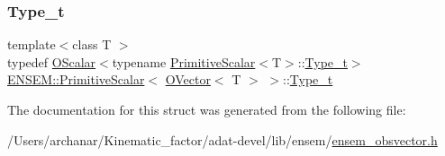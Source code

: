 \subsubsection{\texorpdfstring{Type\_t}{Type\_t}\hspace{0.1cm}{\footnotesize\ttfamily [3/3]}}
{\footnotesize\ttfamily template$<$class T $>$ \\
typedef \mbox{\hyperlink{classENSEM_1_1OScalar}{O\+Scalar}}$<$typename \mbox{\hyperlink{structENSEM_1_1PrimitiveScalar}{Primitive\+Scalar}}$<$T$>$\+::\mbox{\hyperlink{structENSEM_1_1PrimitiveScalar_3_01OVector_3_01T_01_4_01_4_adf4731d74a76b08e5cc003ad658050b0}{Type\+\_\+t}}$>$ \mbox{\hyperlink{structENSEM_1_1PrimitiveScalar}{E\+N\+S\+E\+M\+::\+Primitive\+Scalar}}$<$ \mbox{\hyperlink{classENSEM_1_1OVector}{O\+Vector}}$<$ T $>$ $>$\+::\mbox{\hyperlink{structENSEM_1_1PrimitiveScalar_3_01OVector_3_01T_01_4_01_4_adf4731d74a76b08e5cc003ad658050b0}{Type\+\_\+t}}}



The documentation for this struct was generated from the following file\+:\begin{DoxyCompactItemize}
\item 
/\+Users/archanar/\+Kinematic\+\_\+factor/adat-\/devel/lib/ensem/\mbox{\hyperlink{adat-devel_2lib_2ensem_2ensem__obsvector_8h}{ensem\+\_\+obsvector.\+h}}\end{DoxyCompactItemize}
